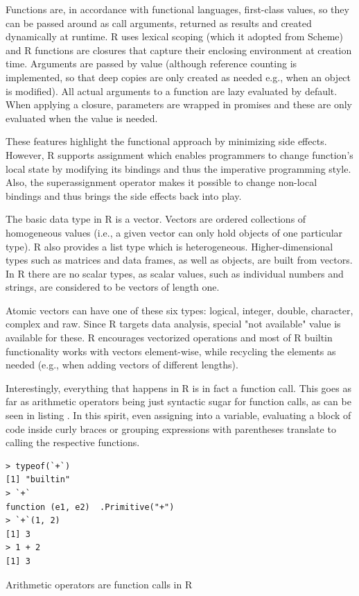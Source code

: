 Functions are, in accordance with functional languages, first-class values, so they can be passed around as call arguments, returned as results and created dynamically at runtime. R uses lexical scoping (which it adopted from Scheme) and R functions are closures that capture their enclosing environment at creation time. Arguments are passed by value (although reference counting is implemented, so that deep copies are only created as needed e.g., when an object is modified). All actual arguments to a function are lazy evaluated by default. When applying a closure, parameters are wrapped in promises and these are only evaluated when the value is needed.

These features highlight the functional approach by minimizing side effects. However, R supports assignment which enables programmers to change function's local state by modifying its bindings and thus the imperative programming style. Also, the superassignment operator makes it possible to change non-local bindings and thus brings the side effects back into play.

The basic data type in R is a vector. Vectors are ordered collections of homogeneous values (i.e., a given vector can only hold objects of one particular type). R also provides a list type which is heterogeneous. Higher-dimensional types such as matrices and data frames, as well as objects, are built from vectors. In R there are no scalar types, as scalar values, such as individual numbers and strings, are considered to be vectors of length one.

Atomic vectors can have one of these six types: logical, integer, double, character, complex and raw. Since R targets data analysis, special "not available" value is available for these. R encourages vectorized operations and most of R builtin functionality works with vectors element-wise, while recycling the elements as needed (e.g., when adding vectors of different lengths).


Interestingly, everything that happens in R is in fact a function call. This goes as far as arithmetic operators being just syntactic sugar for function calls, as can be seen in listing \todo[ref]. In this spirit, even assigning into a variable, evaluating a block of code inside curly braces or grouping expressions with parentheses translate to calling the respective functions.

\begin{listing}[htbp]
  \begin{verbatim}
> typeof(`+`)
[1] "builtin"
> `+`
function (e1, e2)  .Primitive("+")
> `+`(1, 2)
[1] 3
> 1 + 2
[1] 3
  \end{verbatim}
  \caption{\label{xxx}Arithmetic operators are function calls in R}
\end{listing}

